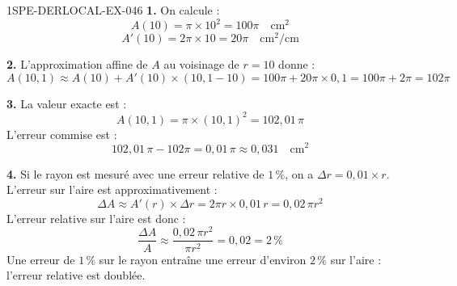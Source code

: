 \begin{corrige}{1SPE-DERLOCAL-EX-046}
\textbf{1.} On calcule :
\[
A(10) = \pi \times 10^2 = 100\pi \quad \text{cm}^2
\]
\[
A'(10) = 2\pi \times 10 = 20\pi \quad \text{cm}^2/\text{cm}
\]

\textbf{2.} L'approximation affine de $A$ au voisinage de $r = 10$ donne :
\[
A(10{,}1) \approx A(10) + A'(10) \times (10{,}1 - 10) = 100\pi + 20\pi \times 0{,}1 = 100\pi + 2\pi = 102\pi
\]

\textbf{3.} La valeur exacte est :
\[
A(10{,}1) = \pi \times (10{,}1)^2 = 102{,}01\,\pi
\]
L'erreur commise est :
\[
102{,}01\,\pi - 102\pi = 0{,}01\,\pi \approx 0{,}031 \quad \text{cm}^2
\]

\textbf{4.} Si le rayon est mesuré avec une erreur relative de $1\,\%$, on a $\Delta r = 0{,}01 \times r$. L'erreur sur l'aire est approximativement :
\[
\Delta A \approx A'(r) \times \Delta r = 2\pi r \times 0{,}01\,r = 0{,}02\,\pi r^2
\]
L'erreur relative sur l'aire est donc :
\[
\frac{\Delta A}{A} \approx \frac{0{,}02\,\pi r^2}{\pi r^2} = 0{,}02 = \boxed{2\,\%}
\]
Une erreur de $1\,\%$ sur le rayon entraîne une erreur d'environ $2\,\%$ sur l'aire : l'erreur relative est doublée.
\end{corrige}
